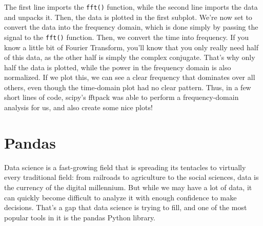 \documentclass[12pt]{article}
\newcommand{\code}{\texttt}
\begin{document}
The first line imports the \code{fft()} function, while the second line imports the data and unpacks it. Then, the data is plotted in the first subplot. We're now set to convert the data into the frequency domain, which is done simply by passing the signal to the \code{fft()} function. Then, we convert the time into frequency. If you know a little bit of Fourier Transform, you'll know that you only really need half of this data, as the other half is simply the complex conjugate. That's why only half the data is plotted, while the power in the frequency domain is also normalized. If we plot this, we can see a clear frequency that dominates over all others, even though the time-domain plot had no clear pattern. Thus, in a few short lines of code, scipy's fftpack was able to perform a frequency-domain analysis for us, and also create some nice plots!

\newpage
\section{Pandas}
Data science is a fast-growing field that is spreading its tentacles to virtually every traditional field: from railroads to agriculture to the social sciences, data is the currency of the digital millennium. But while we may have a lot of data, it can quickly become difficult to analyze it with enough confidence to make decisions. That's a gap that data science is trying to fill, and one of the most popular tools in it is the pandas Python library. 
\end{document}

